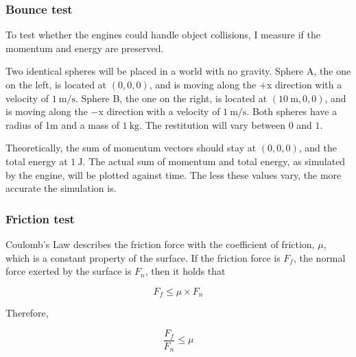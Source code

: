 \documentclass[runningheads]{llncs}
\begin{document}
\subsubsection{Bounce test}

To test whether the engines could handle object collisions, I measure if the momentum and energy are preserved.

Two identical spheres will be placed in a world with no gravity. 
Sphere A, the one on the left, is located at $(0, 0, 0)$, and is moving along the $+$x direction with a velocity of $\SI{1}{\m\per\s}$.
Sphere B, the one on the right, is located at $(\SI{10}{\m}, 0, 0)$, and is moving along the $-$x direction with a velocity of $\SI{1}{\m\per\s}$.
Both spheres have a radius of 1m and a mass of $\SI{1}{\kg}$. The restitution will vary between $0$ and $1$.

\begin{center}
  \end{center}

Theoretically, the sum of momentum vectors should stay at $(0, 0, 0)$, and the total energy at $\SI{1}{\J}$.
The actual sum of momentum and total energy, as simulated by the engine, will be plotted against time.
The less these values vary, the more accurate the simulation is.

\subsubsection{Friction test}

Coulomb's Law describes the friction force with the coefficient of friction, $\mu$, which is a constant property of the surface.
If the friction force is $F_f$, the normal force exerted by the surface is $F_n$, then it holds that

\begin{equation}
F_f \leq \mu \times F_n
\end{equation}

Therefore,

\begin{equation}
\frac{F_f}{F_n} \leq \mu
\end{equation}
\end{document}
